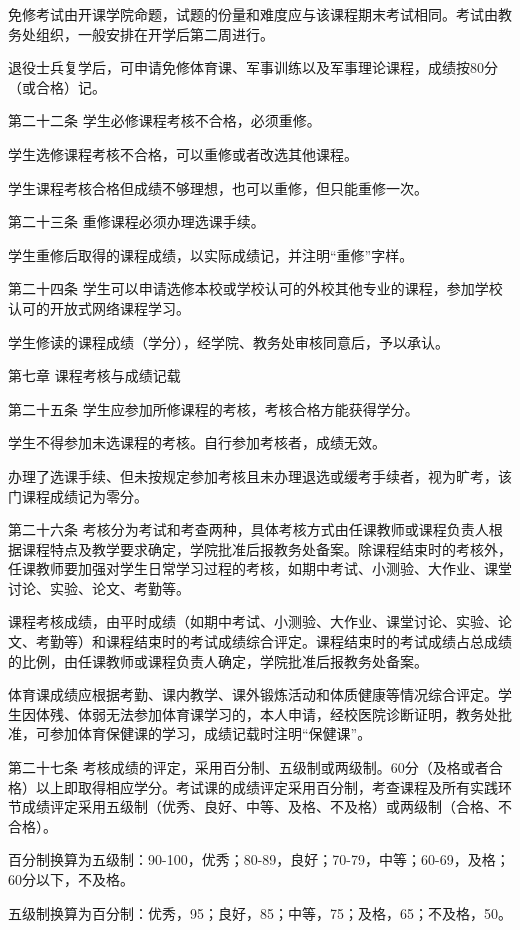 \documentclass[UTF8,12pt,a4paper]{report}
\begin{document}
免修考试由开课学院命题，试题的份量和难度应与该课程期末考试相同。考试由教务处组织，一般安排在开学后第二周进行。

退役士兵复学后，可申请免修体育课、军事训练以及军事理论课程，成绩按80分（或合格）记。

第二十二条  学生必修课程考核不合格，必须重修。

学生选修课程考核不合格，可以重修或者改选其他课程。

学生课程考核合格但成绩不够理想，也可以重修，但只能重修一次。

第二十三条  重修课程必须办理选课手续。

学生重修后取得的课程成绩，以实际成绩记，并注明“重修”字样。

第二十四条  学生可以申请选修本校或学校认可的外校其他专业的课程，参加学校认可的开放式网络课程学习。

学生修读的课程成绩（学分），经学院、教务处审核同意后，予以承认。



第七章  课程考核与成绩记载

第二十五条  学生应参加所修课程的考核，考核合格方能获得学分。

学生不得参加未选课程的考核。自行参加考核者，成绩无效。

办理了选课手续、但未按规定参加考核且未办理退选或缓考手续者，视为旷考，该门课程成绩记为零分。

第二十六条  考核分为考试和考查两种，具体考核方式由任课教师或课程负责人根据课程特点及教学要求确定，学院批准后报教务处备案。除课程结束时的考核外，任课教师要加强对学生日常学习过程的考核，如期中考试、小测验、大作业、课堂讨论、实验、论文、考勤等。

课程考核成绩，由平时成绩（如期中考试、小测验、大作业、课堂讨论、实验、论文、考勤等）和课程结束时的考试成绩综合评定。课程结束时的考试成绩占总成绩的比例，由任课教师或课程负责人确定，学院批准后报教务处备案。

体育课成绩应根据考勤、课内教学、课外锻炼活动和体质健康等情况综合评定。学生因体残、体弱无法参加体育课学习的，本人申请，经校医院诊断证明，教务处批准，可参加体育保健课的学习，成绩记载时注明“保健课”。

第二十七条  考核成绩的评定，采用百分制、五级制或两级制。60分（及格或者合格）以上即取得相应学分。考试课的成绩评定采用百分制，考查课程及所有实践环节成绩评定采用五级制（优秀、良好、中等、及格、不及格）或两级制（合格、不合格）。

百分制换算为五级制：90-100，优秀；80-89，良好；70-79，中等；60-69，及格；60分以下，不及格。

五级制换算为百分制：优秀，95；良好，85；中等，75；及格，65；不及格，50。
\end{document}
